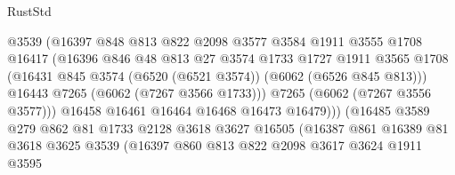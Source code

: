 \begin{lexlean}{RustStd}
\begin{coremodule}
                                @3539
                                (@16397
                                  @848
                                  @813
                                  @822
                                  @2098
                                  @3577
                                  @3584
                                  @1911
                                  @3555
                                  @1708
                                  @16417
                                  (@16396
                                    @846
                                    @48
                                    @813
                                    @27
                                    @3574
                                    @1733
                                    @1727
                                    @1911
                                    @3565
                                    @1708
                                    (@16431
                                      @845
                                      @3574
                                      (@6520 (@6521 @3574))
                                      (@6062 (@6526 @845 @813)))
                                    @16443
                                    @7265
                                    (@6062 (@7267 @3566 @1733)))
                                  @7265
                                  (@6062 (@7267 @3556 @3577)))
                                @16458
                                @16461
                                @16464
                                @16468
                                @16473
                                @16479)))
                          (@16485
                            @3589
                            @279
                            @862
                            @81
                            @1733
                            @2128
                            @3618
                            @3627
                            @16505
                            (@16387
                              @861
                              @16389
                              @81
                              @3618
                              @3625
                              @3539
                              (@16397
                                @860
                                @813
                                @822
                                @2098
                                @3617
                                @3624
                                @1911
                                @3595

\end{coremodule}
\end{lexlean}
